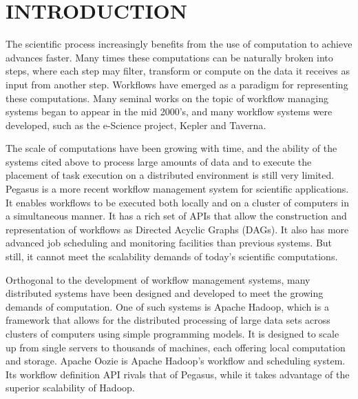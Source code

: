 \chapter{INTRODUCTION}

The scientific process increasingly benefits from the use of computation to achieve advances faster. Many times these computations can be naturally broken into steps, where each step may filter, transform or compute on the data it receives as input from another step.  Workflows have emerged as a paradigm for representing these computations. Many seminal works on the topic of workflow managing systems began to appear in the mid 2000's\cite{yu2005taxonomy, fox2006special, gil2007examining}, and many workflow systems were developed, such as the e-Science project\cite{deelman2009workflows}, Kepler\cite{altintas2004kepler} and Taverna\cite{oinn2006taverna}.  

The scale of computations have been growing with time, and the ability of the systems cited above to process large amounts of data and to execute the placement of task execution on a distributed environment is still very limited.  Pegasus\cite{singh2008workflow} is a more recent workflow management system for scientific applications.  It enables workflows to be executed both locally and on a cluster of computers in a simultaneous manner.  It has a rich set of APIs that allow the construction and representation of workflows as Directed Acyclic Graphs (DAGs).  It also has more advanced job scheduling and monitoring facilities than previous systems.  But still, it cannot meet the scalability demands of today's scientific computations.  

Orthogonal to the development of workflow management systems, many distributed systems have been designed and developed to meet the growing demands of computation.  One of such systems is Apache Hadoop, which is a framework that allows for the distributed processing of large data sets across clusters of computers using simple programming models. It is designed to scale up from single servers to thousands of machines, each offering local computation and storage. Apache Oozie\cite{islam2012oozie} is Apache Hadoop's workflow and scheduling system.  Its workflow definition API rivals that of Pegasus, while it takes advantage of the superior scalability of Hadoop.

